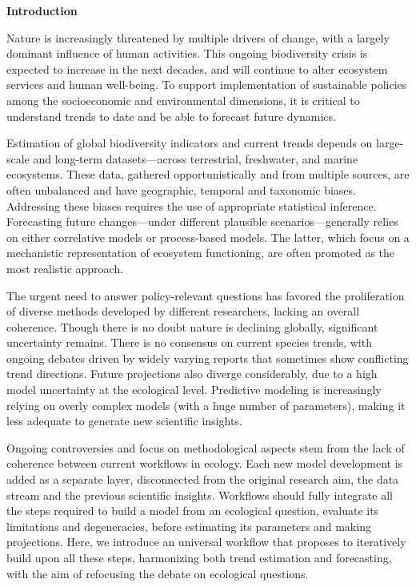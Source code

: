 \documentclass[11pt]{article}
\begin{document}
\noindent \textbf{Introduction}

Nature is increasingly threatened by multiple drivers of change, with a largely dominant influence of human activities. This ongoing biodiversity crisis is expected to increase in the next decades, and will continue to alter ecosystem services and human well-being. To support implementation of sustainable policies among the socioeconomic and environmental dimensions, it is critical to understand trends to date and be able to forecast future dynamics. 

Estimation of global biodiversity indicators and current trends depends on large-scale and long-term datasets---across terrestrial, freshwater, and marine ecosystems. These data, gathered opportunistically and from multiple sources, are often unbalanced and have geographic, temporal and taxonomic biases. Addressing these biases requires the use of appropriate statistical inference.
Forecasting future changes---under different plausible scenarios---generally relies on either correlative models or process-based models. The latter, which focus on a mechanistic representation of ecosystem functioning, are often promoted as the most realistic approach.

The urgent need to answer policy-relevant questions has favored the proliferation of diverse methods developed by different researchers, lacking an overall coherence. Though there is no doubt nature is declining globally, significant uncertainty remains. There is no consensus on current species trends, with ongoing debates driven by widely varying reports that sometimes show conflicting trend directions. Future projections also diverge considerably, due to a high model uncertainty at the ecological level. Predictive modeling is increasingly relying on overly complex models (with a huge number of parameters), making it less adequate to generate new scientific insights.

Ongoing controversies and focus on methodological aspects stem from the lack of coherence between current workflows in ecology. Each new model development is added as a separate layer, disconnected from the original research aim, the data stream and the previous scientific insights. Workflows should fully integrate all the steps required to build a model from an ecological question, evaluate its limitations and degeneracies, before estimating its parameters and making projections. Here, we introduce an universal workflow that proposes to iteratively build upon all these steps, harmonizing both trend estimation and forecasting, with the aim of refocusing the debate on ecological questions. 
\end{document}
